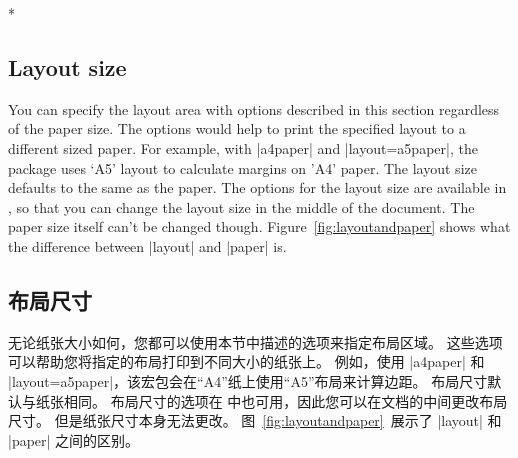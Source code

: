 
\begin{paracol}{2}
\switchcolumn[0]*
\subsection{Layout size}
You can specify the layout area with options described in this
section regardless of the paper size.
The options would help to print the specified layout to a different
sized paper.  For example, with |a4paper| and |layout=a5paper|, the
package uses `A5' layout to calculate margins on 'A4' paper.
The layout size defaults to the same as the paper.
The options for the layout size are available in ,
so that you can change the layout size in the middle of the document.
The paper size itself can't be changed though.
Figure~\ref{fig:layoutandpaper} shows what the difference between
|layout| and |paper| is.
\switchcolumn
\subsection{布局尺寸}

无论纸张大小如何，您都可以使用本节中描述的选项来指定布局区域。
这些选项可以帮助您将指定的布局打印到不同大小的纸张上。
例如，使用 |a4paper| 和 |layout=a5paper|，该宏包会在“A4”纸上使用“A5”布局来计算边距。
布局尺寸默认与纸张相同。
布局尺寸的选项在  中也可用，因此您可以在文档的中间更改布局尺寸。
但是纸张尺寸本身无法更改。
图~\ref{fig:layoutandpaper}~展示了 |layout| 和 |paper| 之间的区别。
\end{paracol}


